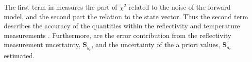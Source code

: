 %
The first term in  measures the part of $\chi^2$ related to the noise of the forward model, and the second part the relation to the state vector. Thus the second term describes the accuracy of the quantities within the reflectivity and temperature measurements \citep{rodgers_inverse_2000}.
Furthermore, are the error contribution from the reflectivity measurement uncertainty, $\mathbf{S}_{y_\epsilon}$, and the uncertainty of the a priori values, $\mathbf{S}_{a_\epsilon}$ estimated. 

